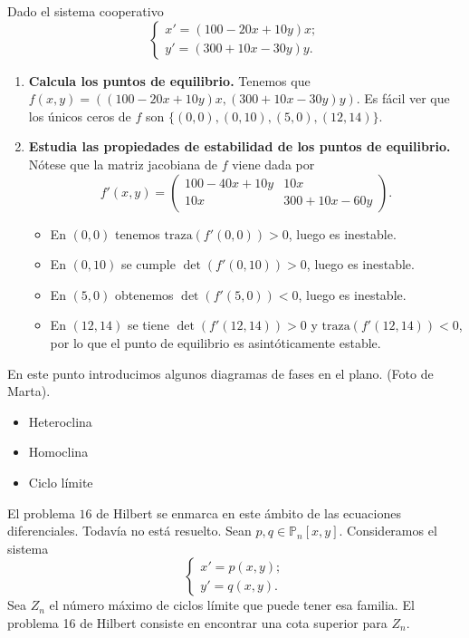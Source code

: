 \begin{ex}
  Dado el sistema cooperativo
  \begin{equation}
    \label{eq:cooperativo}
    \begin{cases}
      x' = (100 − 20 x + 10 y)x;\\
      y' = (300 + 10 x − 30 y)y.
    \end{cases}
  \end{equation}
  \begin{enumerate}
  \item \textbf{Calcula los puntos de equilibrio.} Tenemos que
    $f(x,y) = ((100-20x+10y)x, (300+10x-30y)y)$. Es fácil ver que los únicos ceros de $f$ son
    $\{(0,0), (0,10), (5,0), (12,14)\}$.
  \item \textbf{Estudia las propiedades de estabilidad de los puntos de equilibrio.} Nótese que la
    matriz jacobiana de $f$ viene dada por
    \[ f'(x,y) = \left( \begin{matrix}
          100 -40x +10y & 10x \\
          10x & 300 +10x-60y
        \end{matrix} \right).

    \]
    \begin{itemize}
    \item En $(0,0)$ tenemos $\mathrm{traza}(f'(0,0)) > 0$, luego es inestable.
    \item En $(0,10)$ se cumple $\det(f'(0,10)) > 0$, luego es inestable.
    \item En $(5,0)$ obtenemos $\det(f'(5,0)) < 0$, luego es inestable.
    \item En $(12,14)$ se tiene $\det(f'(12,14)) > 0$ y $\mathrm{traza}(f'(12,14)) < 0$, por lo que
      el punto de equilibrio es asintóticamente estable. \qedhere
    \end{itemize}
  \end{enumerate}
\end{ex}

En este punto introducimos algunos diagramas de fases en el plano. (Foto de Marta).

\begin{itemize}
\item Heteroclina
\item Homoclina
\item Ciclo límite
\end{itemize}


El problema $16$ de Hilbert se enmarca en este ámbito de las ecuaciones diferenciales. Todavía no
está resuelto. Sean $p,q \in \mathbb{P}_n[x,y]$. Consideramos el sistema
\begin{equation}
  \label{eq:hilbert}
  \begin{cases}
    x' = p(x,y);\\
    y' = q(x,y).
  \end{cases}
\end{equation}
Sea $Z_n$ el número máximo de ciclos límite que puede tener esa familia. El problema 16 de Hilbert
consiste en encontrar una cota superior para $Z_n$.

